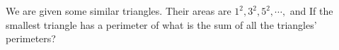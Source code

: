 We are given some similar triangles.  Their areas are $1^2,3^2,5^2,\cdots,$ and   If the smallest triangle has a perimeter of  what is the sum of all the triangles' perimeters?